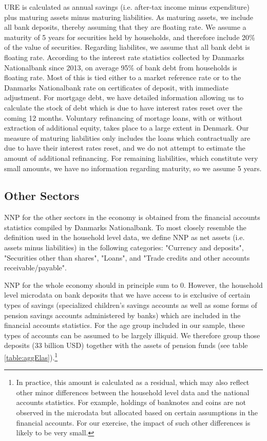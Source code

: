 \documentclass[titlepage]{\econtex}\newcommand{\texname}{ConsumptionHeterogeneity}
\begin{document}
URE is calculated as annual savings (i.e. after-tax income minus expenditure) plus maturing assets minus maturing liabilities. As maturing assets, we include all bank deposits, thereby assuming that they are floating rate. We assume a maturity of 5 years for securities held by households, and therefore include 20\% of the value of securities. Regarding liabilites, we assume that all bank debt is floating rate. According to the interest rate statistics collected by Danmarks Nationalbank since 2013, on average 95\% of bank debt from households is floating rate. Most of this is tied either to a market reference rate or to the Danmarks Nationalbank rate on certificates of deposit, with immediate adjustment. For mortgage debt, we have detailed information allowing us to calculate the stock of debt which is due to have interest rates reset over the coming 12 months. Voluntary refinancing of mortage loans, with or without extraction of additional equity, takes place to a large extent in Denmark. Our measure of maturing liabilities only includes the loans which contractually are due to have their interest rates reset, and we do not attempt to estimate the amount of additional refinancing. For remaining liabilities, which constitute very small amounts, we have no information regarding maturity, so we assume 5 years. 

\subsection{Other Sectors}
NNP for the other sectors in the economy is obtained from the financial accounts statistics compiled by Danmarks Nationalbank. To most closely resemble the definition used in the household level data, we define NNP as net assets (i.e. assets minus liabilities) in the following categories: "Currency and deposits", "Securities other than shares", "Loans", and "Trade credits and other accounts receivable/payable". 

NNP for the whole economy should in principle sum to 0. However, the household level microdata on bank deposits that we have access to is exclusive of certain types of savings (specialized children's savings accounts as well as some forms of pension savings accounts administered by banks) which are included in the financial accounts statistics. For the age group included in our sample, these types of accounts can be assumed to be largely illiquid. We therefore group those deposits (33 billion USD) together with the assets of pension funds (see table \ref{table:aggElas}).\footnote{In practice, this amount is calculated as a residual, which may also reflect other minor differences between the household level data and the national accounts statistics. For example, holdings of banknotes and coins are not observed in the microdata but allocated based on certain assumptions in the financial accounts. For our exercise, the impact of such other differences is likely to be very small.}
\end{document}

